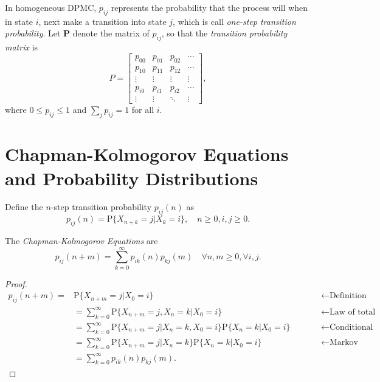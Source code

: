 \documentclass[../Note.tex]{subfiles}
\begin{document}
In homogeneous DPMC, $p_{ij}$ represents the probability that the process will when in state $i$, next make a transition into state $j$, which is call \textit{one-step transition probability}. Let $\mathbf{P}$ denote the matrix of $p_{ij}$, so that the \textit{transition probability matrix} is 
\[
    P=
    \begin{bmatrix}
    p_{00} & p_{01} & p_{02} & \cdots \\
    p_{10} & p_{11} & p_{12} & \cdots \\
    \vdots & \vdots & \vdots & \vdots \\
    p_{i0} & p_{i1} & p_{i2} & \cdots \\
    \vdots & \vdots & \ddots & \vdots
    \end{bmatrix},
\]
where $0 \leq p_{ij} \leq 1$ and $\sum_{j} p_{ij} = 1$ for all $i$.


\section{Chapman-Kolmogorov Equations and Probability Distributions}

Define the $n$-step transition probability $p_{ij}(n)$ as 
\begin{equation}
    p_{ij}(n) = \mathrm{P}\{X_{n+k} = j | X_k = i\}, \quad n \geq 0, i,j \geq 0.
\end{equation} 

\begin{theorem}
    The \textit{Chapman-Kolmogorov Equations} are 
    \begin{equation}
        p_{ij}(n+m) = \sum\limits_{k=0}^{\infty} p_{ik}{(n)}p_{kj}{(m)} \quad \forall n,m \ge 0, \forall i,j.
    \end{equation} 
\end{theorem}

\begin{proof}
    \[
        \begin{aligned}
            p_{ij}(n+m) = &  \mathrm{P}\{X_{n+m} = j | X_0 = i\} \qquad && \leftarrow \text{Definition} \\
            & = \sum_{k = 0}^{\infty} \mathrm{P}\{X_{n+m} = j, X_n = k | X_0 = i\} \qquad && \leftarrow \text{Law of total probability} \\
            & = \sum_{k = 0}^{\infty} \mathrm{P}\{X_{n+m} = j | X_n = k, X_0 = i\} \mathrm{P}\{X_n = k | X_0 = i\} \qquad && \leftarrow \text{Conditional probability}  \\
            & = \sum_{k = 0}^{\infty} \mathrm{P}\{X_{n+m} = j | X_n = k\} \mathrm{P}\{X_n = k | X_0 = i\} \qquad && \leftarrow \text{Markov property} \\
            & = \sum\limits_{k=0}^{\infty} p_{ik}{(n)}p_{kj}{(m)}.
        \end{aligned}    
    \] 
\end{proof}
\end{document}

